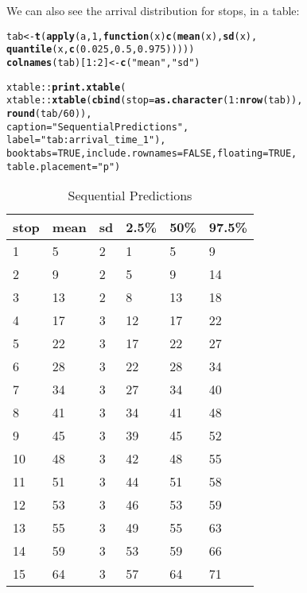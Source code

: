\documentclass[11pt]{article}\usepackage[]{graphicx}\usepackage[]{color}
\makeatletter
\newcommand{\hlnum}[1]{\textcolor[rgb]{0.686,0.059,0.569}{#1}}%
\newcommand{\hlstr}[1]{\textcolor[rgb]{0.192,0.494,0.8}{#1}}%
\newcommand{\hlopt}[1]{\textcolor[rgb]{0,0,0}{#1}}%
\newcommand{\hlstd}[1]{\textcolor[rgb]{0.345,0.345,0.345}{#1}}%
\newcommand{\hlkwa}[1]{\textcolor[rgb]{0.161,0.373,0.58}{\textbf{#1}}}%
\newcommand{\hlkwb}[1]{\textcolor[rgb]{0.69,0.353,0.396}{#1}}%
\newcommand{\hlkwc}[1]{\textcolor[rgb]{0.333,0.667,0.333}{#1}}%
\newcommand{\hlkwd}[1]{\textcolor[rgb]{0.737,0.353,0.396}{\textbf{#1}}}%
\newenvironment{kframe}{%
 \def\at@end@of@kframe{}%
 \ifinner\ifhmode%
  \def\at@end@of@kframe{\end{minipage}}%
  \begin{minipage}{\columnwidth}%
 \fi\fi%
 \def\FrameCommand##1{\hskip\@totalleftmargin \hskip-\fboxsep
 \colorbox{shadecolor}{##1}\hskip-\fboxsep
     \hskip-\linewidth \hskip-\@totalleftmargin \hskip\columnwidth}%
 \MakeFramed {\advance\hsize-\width
   \@totalleftmargin\z@ \linewidth\hsize
   \@setminipage}}%
 {\par\unskip\endMakeFramed%
 \at@end@of@kframe}
\makeatother
\begin{document}
We can also see the arrival distribution for stops, in a table:
\begin{kframe}
\begin{alltt}
\hlstd{tab} \hlkwb{<-} \hlkwd{t}\hlstd{(}\hlkwd{apply}\hlstd{(a,} \hlnum{1}\hlstd{,} \hlkwa{function}\hlstd{(}\hlkwc{x}\hlstd{)} \hlkwd{c}\hlstd{(}\hlkwd{mean}\hlstd{(x),} \hlkwd{sd}\hlstd{(x),}
                                   \hlkwd{quantile}\hlstd{(x,} \hlkwd{c}\hlstd{(}\hlnum{0.025}\hlstd{,} \hlnum{0.5}\hlstd{,} \hlnum{0.975}\hlstd{)))))}
\hlkwd{colnames}\hlstd{(tab)[}\hlnum{1}\hlopt{:}\hlnum{2}\hlstd{]} \hlkwb{<-} \hlkwd{c}\hlstd{(}\hlstr{"mean"}\hlstd{,} \hlstr{"sd"}\hlstd{)}

\hlstd{xtable}\hlopt{::}\hlkwd{print.xtable}\hlstd{(}
    \hlstd{xtable}\hlopt{::}\hlkwd{xtable}\hlstd{(}\hlkwd{cbind}\hlstd{(}\hlkwc{stop} \hlstd{=} \hlkwd{as.character}\hlstd{(}\hlnum{1}\hlopt{:}\hlkwd{nrow}\hlstd{(tab)),}
                         \hlkwd{round}\hlstd{(tab} \hlopt{/} \hlnum{60}\hlstd{)),}
                   \hlkwc{caption} \hlstd{=} \hlstr{"Sequential Predictions"}\hlstd{,}
                   \hlkwc{label} \hlstd{=} \hlstr{"tab:arrival_time_1"}\hlstd{),}
    \hlkwc{booktabs} \hlstd{=} \hlnum{TRUE}\hlstd{,} \hlkwc{include.rownames} \hlstd{=} \hlnum{FALSE}\hlstd{,} \hlkwc{floating} \hlstd{=} \hlnum{TRUE}\hlstd{,}
    \hlkwc{table.placement} \hlstd{=} \hlstr{"p"}\hlstd{)}
\end{alltt}
\end{kframe}%
\begin{table}[p]
\centering
\begin{tabular}{llllll}
  \toprule
stop & mean & sd & 2.5\% & 50\% & 97.5\% \\ 
  \midrule
1 & 5 & 2 & 1 & 5 & 9 \\ 
  2 & 9 & 2 & 5 & 9 & 14 \\ 
  3 & 13 & 2 & 8 & 13 & 18 \\ 
  4 & 17 & 3 & 12 & 17 & 22 \\ 
  5 & 22 & 3 & 17 & 22 & 27 \\ 
  6 & 28 & 3 & 22 & 28 & 34 \\ 
  7 & 34 & 3 & 27 & 34 & 40 \\ 
  8 & 41 & 3 & 34 & 41 & 48 \\ 
  9 & 45 & 3 & 39 & 45 & 52 \\ 
  10 & 48 & 3 & 42 & 48 & 55 \\ 
  11 & 51 & 3 & 44 & 51 & 58 \\ 
  12 & 53 & 3 & 46 & 53 & 59 \\ 
  13 & 55 & 3 & 49 & 55 & 63 \\ 
  14 & 59 & 3 & 53 & 59 & 66 \\ 
  15 & 64 & 3 & 57 & 64 & 71 \\ 
   \bottomrule
\end{tabular}
\caption{Sequential Predictions} 
\label{tab:arrival_time_1}
\end{table}
\end{document}
